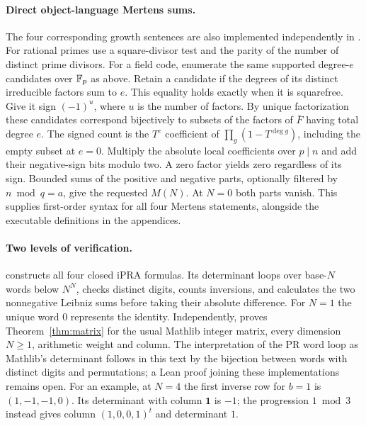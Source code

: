 \paragraph{Direct object-language Mertens sums.}
The four corresponding growth sentences are also implemented independently in . For rational primes use a square-divisor test and the parity of the number of distinct prime divisors. For a field code, enumerate the same supported degree-$e$ candidates over $\mathbb F_p$ as above. Retain a candidate if the degrees of its distinct irreducible factors sum to $e$. This equality holds exactly when it is squarefree. Give it sign $(-1)^u$, where $u$ is the number of factors. By unique factorization these candidates correspond bijectively to subsets of the factors of $\bar F$ having total degree $e$. The signed count is the $T^e$ coefficient of $\prod_g(1-T^{\deg g})$, including the empty subset at $e=0$. Multiply the absolute local coefficients over $p\mid n$ and add their negative-sign bits modulo two. A zero factor yields zero regardless of its sign. Bounded sums of the positive and negative parts, optionally filtered by $n\bmod q=a$, give the requested $M(N)$. At $N=0$ both parts vanish. This supplies first-order syntax for all four Mertens statements, alongside the executable definitions in the appendices.

\paragraph{Two levels of verification.}
 constructs all four closed iPRA formulas. Its determinant loops over base-$N$ words below $N^N$, checks distinct digits, counts inversions, and calculates the two nonnegative Leibniz sums before taking their absolute difference. For $N=1$ the unique word $0$ represents the identity. Independently,  proves Theorem~\ref{thm:matrix} for the usual Mathlib integer matrix, every dimension $N\ge1$, arithmetic weight and column. The interpretation of the PR word loop as Mathlib's determinant follows in this text by the bijection between words with distinct digits and permutations; a Lean proof joining these implementations remains open. For an example, at $N=4$ the first inverse row for $b=1$ is $(1,-1,-1,0)$. Its determinant with column $\mathbf1$ is $-1$; the progression $1\bmod 3$ instead gives column $(1,0,0,1)^t$ and determinant $1$.
